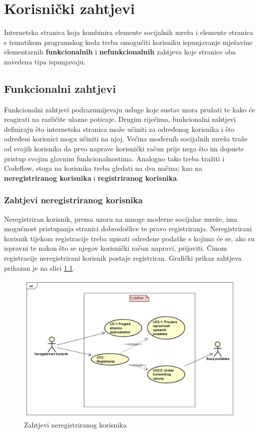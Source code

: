 \documentclass[times, utf8, zavrsni]{fer}
\begin{document}
	\chapter{Korisnički zahtjevi}
	\label{cha:zahtjevi}
	Internetska stranica koja kombinira elemente socijalnih mreža i elemente stranica s tematikom programskog koda treba omogućiti korisniku ispunjavanje mješavine elementarnih \textbf{funkcionalnih} i \textbf{nefunkcionalnih} zahtjeva koje stranice oba navedena tipa ispunjavaju.
	
		\section{Funkcionalni zahtjevi}
		Funkcionalni zahtjevi podrazumijevaju usluge koje sustav mora pružati te kako će reagirati na različite ulazne poticaje. Drugim riječima, funkcionalni zahtjevi definiraju što internetska stranica može učiniti za određenog korisnika i što određeni korisnici mogu učiniti na njoj.
		Većina modernih socijalnih mreža traže od svojih korisnika da prvo naprave korisnički račun prije nego što im dopuste pristup svojim glavnim funkcionalnostima. Analogno tako treba tražiti i Codeflow, stoga na korisnika treba gledati na dva načina; kao na \textbf{neregistriranog korisnika} i \textbf{registriranog korisnika}.
	
			\subsection{Zahtjevi neregistriranog korisnika}
			Neregistriran korisnik, prema uzoru na mnoge moderne socijalne mreže, ima mogućnost pristupanja stranici dobrodošlice te pravo registriranja. Neregistrirani korisnik tijekom registracije treba upisati određene podatke s kojima će se, ako su ispravni te nakon što se njegov korisnički račun napravi, prijaviti. Činom registracije neregistrirani korisnik postaje registriran. Grafički prikaz zahtjeva prikazan je na slici \ref{fig:zahtjevi-nereg}.
			\begin{figure}[H]
				\centering
				\includegraphics[width=\linewidth]{pictures/zahtjevi/nereg_korisnik.png}
				\caption{Zahtjevi neregistriranog korisnika}
				\label{fig:zahtjevi-nereg}
			\end{figure}
	
\end{document}
